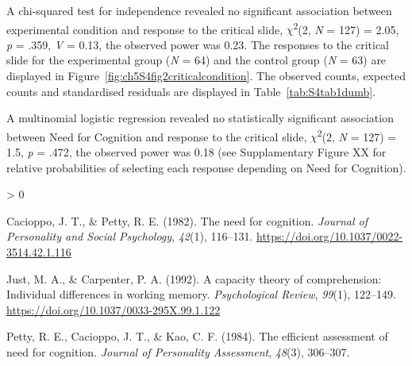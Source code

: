 \documentclass[
  american,
  man,floatsintext]{apa7}
\newlength{\cslhangindent}
\newenvironment{CSLReferences}[2] %
 {%
  \setlength{\parindent}{0pt}
  \ifodd #1 \everypar{\setlength{\hangindent}{\cslhangindent}}\ignorespaces\fi
  \ifnum #2 > 0
  \setlength{\parskip}{#2\baselineskip}
  \fi
 }%
 {}
\begin{document}
A chi-squared test for independence revealed no significant association between experimental condition and response to the critical slide, \(\chi\)\textsuperscript{2}(2, \emph{N} = 127) = 2.05, \emph{p} = .359, \emph{V} = 0.13, the observed power was 0.23. The responses to the critical slide for the experimental group (\emph{N} = 64) and the control group (\emph{N} = 63) are displayed in Figure~\ref{fig:ch5S4fig2criticalcondition}. The observed counts, expected counts and standardised residuals are displayed in Table~\ref{tab:S4tab1dumb}.

A multinomial logistic regression revealed no statistically significant association between Need for Cognition and response to the critical slide, \(\chi\)\textsuperscript{2}(2, \emph{N} = 127) = 1.5, \emph{p} = .472, the observed power was 0.18 (see Supplamentary Figure XX for relative probabilities of selecting each response depending on Need for Cognition).

\hypertarget{refs}{}
\begin{CSLReferences}{1}{0}
\leavevmode\hypertarget{ref-cacioppo_need_1982}{}%
Cacioppo, J. T., \& Petty, R. E. (1982). The need for cognition. \emph{Journal of Personality and Social Psychology}, \emph{42}(1), 116--131. \url{https://doi.org/10.1037/0022-3514.42.1.116}

\leavevmode\hypertarget{ref-just_capacity_1992}{}%
Just, M. A., \& Carpenter, P. A. (1992). A capacity theory of comprehension: Individual differences in working memory. \emph{Psychological Review}, \emph{99}(1), 122--149. \url{https://doi.org/10.1037/0033-295X.99.1.122}

\leavevmode\hypertarget{ref-petty_efficient_1984}{}%
Petty, R. E., Cacioppo, J. T., \& Kao, C. F. (1984). The efficient assessment of need for cognition. \emph{Journal of Personality Assessment}, \emph{48}(3), 306--307.

\end{CSLReferences}
\end{document}
